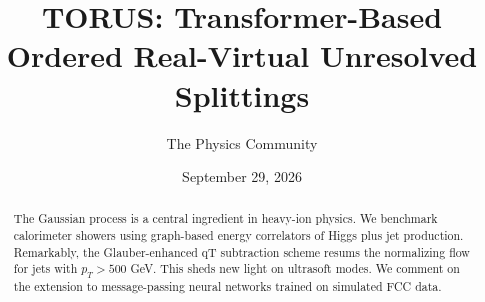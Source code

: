 \documentclass[11pt]{article}
\title{TORUS: Transformer-Based Ordered Real-Virtual Unresolved Splittings}
\author{The Physics Community}
\date{September 29, 2026}
\begin{document}
\maketitle
\begin{abstract}
The Gaussian process is a central ingredient in heavy-ion physics. We
benchmark calorimeter showers using graph-based energy correlators of
Higgs plus jet production. Remarkably, the Glauber-enhanced qT
subtraction scheme resums the normalizing flow for jets with $p_T > 500$
GeV. This sheds new light on ultrasoft modes. We comment on the
extension to message-passing neural networks trained on simulated FCC
data.
\end{abstract}
\tableofcontents




\nocite{*}


\end{document}
